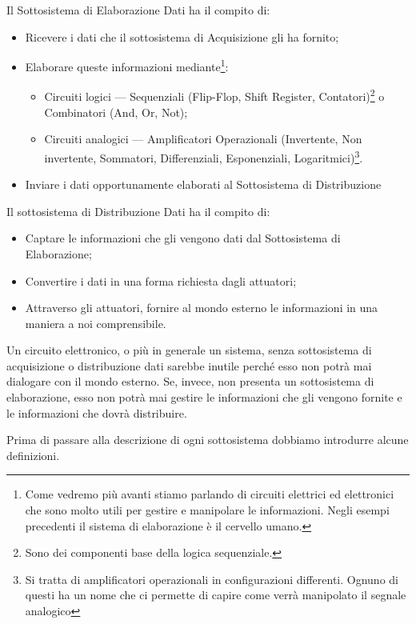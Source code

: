 \documentclass[12pt, letterpaper]{book}
\begin{document}
Il Sottosistema di Elaborazione Dati ha il compito di:
\begin{itemize}[leftmargin=1.2cm, itemsep=1pt, topsep=5pt]
  \item  Ricevere i dati che il sottosistema di Acquisizione gli ha fornito;
  \item Elaborare queste informazioni mediante\footnote{Come vedremo più avanti stiamo parlando di circuiti elettrici ed elettronici che sono molto utili per gestire e manipolare le informazioni. Negli esempi precedenti il sistema di elaborazione è il cervello umano.}:
        \begin{itemize}[itemsep=1pt, topsep=2pt]
          \item Circuiti logici --- Sequenziali (Flip-Flop, Shift Register, Contatori)\footnote{Sono dei componenti base della logica sequenziale.} o Combinatori (And, Or, Not);
          \item Circuiti analogici --- Amplificatori Operazionali (Invertente, Non invertente, Sommatori, Differenziali, Esponenziali, Logaritmici)\footnote{Si tratta di amplificatori operazionali in configurazioni differenti. Ognuno di questi ha un nome che ci permette di capire come verrà manipolato il segnale analogico}.
        \end{itemize}
  \item Inviare i dati opportunamente elaborati al Sottosistema di Distribuzione
\end{itemize}

Il sottosistema di Distribuzione Dati ha il compito di:
\begin{itemize}[leftmargin=1.2cm, itemsep=1pt, topsep=5pt]
  \item Captare le informazioni che gli vengono dati dal Sottosistema di Elaborazione;
  \item Convertire i dati in una forma richiesta dagli attuatori;
  \item Attraverso gli attuatori, fornire al mondo esterno le informazioni in una maniera a noi comprensibile.
\end{itemize}

Un circuito elettronico, o più in generale un sistema, senza sottosistema di acquisizione o distribuzione dati sarebbe inutile perché esso non potrà mai dialogare con il mondo esterno. Se, invece, non presenta un sottosistema di elaborazione, esso non potrà mai gestire le informazioni che gli vengono fornite e le informazioni che dovrà distribuire.

Prima di passare alla descrizione di ogni sottosistema dobbiamo introdurre alcune definizioni.
\end{document}
